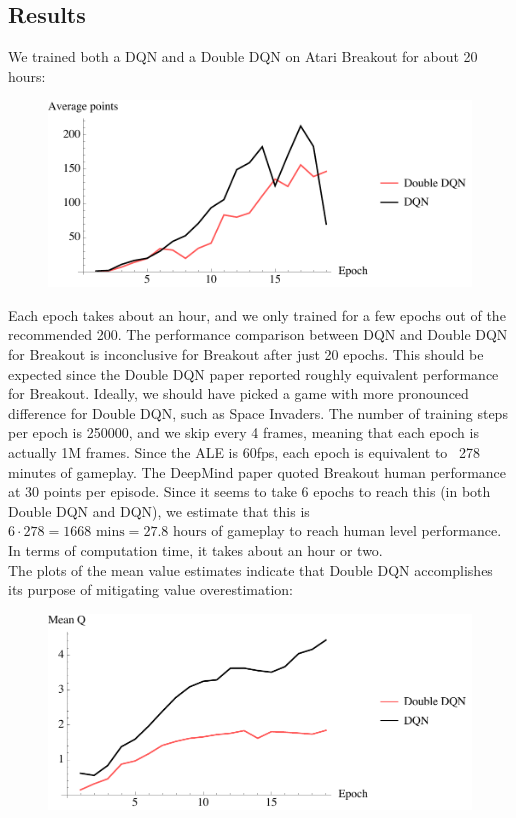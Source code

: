 \documentclass{article}
\begin{document}
\subsection{Results}
We trained both a DQN and a Double DQN on Atari Breakout for about 20 hours:
  \begin{figure}[H]
    \centering
    \includegraphics[width=120mm]{dqn_rewardper.pdf}
  \end{figure}
  Each epoch takes about an hour, and we only trained for a few epochs out of the recommended 200. The performance comparison between DQN and Double DQN for Breakout is inconclusive for Breakout after just 20 epochs. This should be expected since the Double DQN paper reported roughly equivalent performance for Breakout. Ideally, we should have picked a game with more pronounced difference for Double DQN, such as Space Invaders. The number of training steps per epoch is 250000, and we skip every 4 frames, meaning that each epoch is actually 1M frames. Since the ALE is 60fps, each epoch is equivalent to ~278 minutes of gameplay. The DeepMind paper quoted Breakout human performance at 30 points per episode. Since it seems to take 6 epochs to reach this (in both Double DQN and DQN), we estimate that this is $6 \cdot 278 = 1668 \mbox{ mins} = 27.8 \mbox{ hours}$ of gameplay to reach human level performance. In terms of computation time, it takes about an hour or two. \\

  The plots of the mean value estimates indicate that Double DQN accomplishes its purpose of mitigating value overestimation:
  \begin{figure}[H]
    \centering
    \includegraphics[width=120mm]{dqn_meanq.pdf}
  \end{figure}
\end{document}

